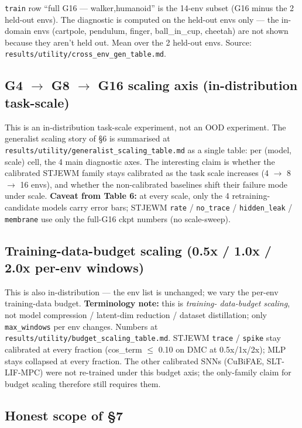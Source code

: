 \documentclass{article}
\begin{document}
\texttt{train} row ``full G16 --- walker,humanoid'' is the 14-env subset (G16 minus the 2 held-out envs). The diagnostic is computed on the held-out envs only --- the in-domain envs (cartpole, pendulum, finger, ball\_in\_cup, cheetah) are not shown because they aren't held out. Mean over the 2 held-out envs. Source: \texttt{results/utility/cross\_env\_gen\_table.md}.

\subsection{G4 $\to$ G8 $\to$ G16 scaling axis (in-distribution task-scale)}

This is an in-distribution task-scale experiment, not an OOD experiment.
The generalist scaling story of §6 is summarised at
\texttt{results/utility/generalist\_scaling\_table.md} as a single table: per
(model, scale) cell, the 4 main diagnostic axes. The interesting claim
is whether the calibrated STJEWM family stays calibrated as the task
scale increases (4 $\to$ 8 $\to$ 16 envs), and whether the non-calibrated
baselines shift their failure mode under scale. \textbf{Caveat from
Table 6:} at every scale, only the 4 retraining-candidate models
carry error bars; STJEWM \texttt{rate} / \texttt{no\_trace} / \texttt{hidden\_leak} /
\texttt{membrane} use only the full-G16 ckpt numbers (no scale-sweep).

\subsection{Training-data-budget scaling (0.5x / 1.0x / 2.0x per-env windows)}

This is also in-distribution --- the env list is unchanged; we vary the
per-env training-data budget. \textbf{Terminology note:} this is \emph{training-
data-budget scaling}, not model compression / latent-dim reduction /
dataset distillation; only \texttt{max\_windows} per env changes. Numbers at
\texttt{results/utility/budget\_scaling\_table.md}. STJEWM \texttt{trace} / \texttt{spike}
stay calibrated at every fraction (cos\_term $\leq$ 0.10 on DMC at 0.5x/1x/2x);
MLP stays collapsed at every fraction. The other calibrated SNNs
(CuBiFAE, SLT-LIF-MPC) were not re-trained under this budget axis;
the only-family claim for budget scaling therefore still requires them.

\subsection{Honest scope of §7}
\end{document}
